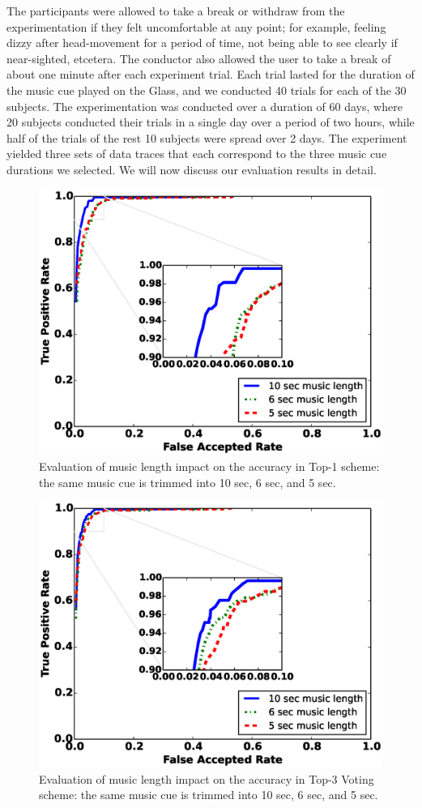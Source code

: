 The participants were allowed to take a break or withdraw from the 
experimentation if they felt uncomfortable at any point; for example, feeling 
dizzy after head-movement for a period of time, not being able to see clearly 
if near-sighted, etcetera. The conductor also allowed the user to take a break 
of about one minute after each experiment trial.
Each trial lasted for the duration of the music cue played on the Glass, and 
we conducted 40 trials for each of the 30 subjects. 
The experimentation was conducted over a duration of 60 days, where 20 
subjects conducted their trials in a single day over a period of two hours, 
while half of the trials of the rest 10 subjects were spread over 2 days.
The experiment yielded three sets of data traces that each correspond to 
the three music cue durations we selected. 
We will now discuss our evaluation results in detail.

\begin{figure}[t]
\centering
\includegraphics [width=.85\linewidth]{figure/top1_roc.eps}
\caption{Evaluation of music length impact on the accuracy in Top-1 scheme: the same music cue is trimmed into 10 sec, 6 sec, and 5 sec.}
\label{fig:roc-top1}
\end{figure}

\begin{figure}[t]
\centering
\includegraphics [width=.85\linewidth]{figure/top3_roc.eps}
\caption{Evaluation of music length impact on the accuracy in Top-3 Voting scheme: the same music cue is trimmed into 10 sec, 6 sec, and 5 sec.}
\label{fig:roc-top3}
\end{figure}

